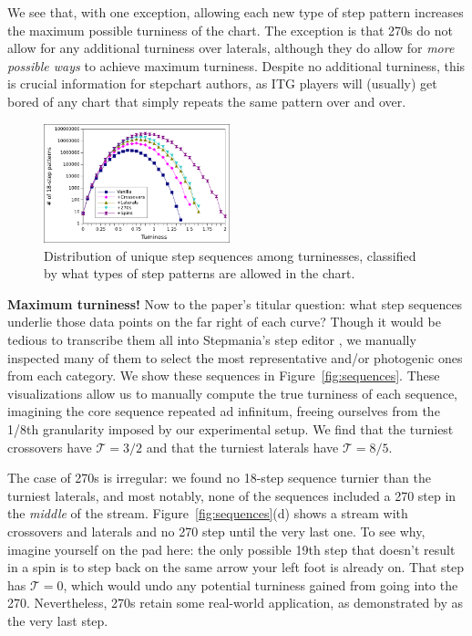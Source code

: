 \documentclass[10pt]{sigplanconf}
\begin{document}
We see that, with one exception, allowing each new type of step pattern increases the maximum possible turniness of the chart.
The exception is that 270s do not allow for any additional turniness over laterals, although they do allow for {\em more possible ways} to achieve maximum turniness.
Despite no additional turniness, this is crucial information for stepchart authors, as ITG players will (usually) get bored of any chart that simply repeats the same pattern over and over.

\begin{figure}[t]
	\begin{center}
	\includegraphics[width=0.48\textwidth]{turniness.pdf}
	\end{center}
	\caption{Distribution of unique step sequences among turninesses, classified by what types of step patterns are allowed in the chart.}
	\label{fig:graph}
\end{figure}

{\bf Maximum turniness!}
Now to the paper's titular question: what step sequences underlie those data points on the far right of each curve?
Though it would be tedious to transcribe them all into Stepmania's step editor \cite{stepmania}, we manually inspected many of them to select the most representative and/or photogenic ones from each category. We show these sequences in Figure~\ref{fig:sequences}.
These visualizations allow us to manually compute the true turniness of each sequence, imagining the core sequence repeated ad infinitum, freeing ourselves from the 1/8th granularity imposed by our experimental setup.
We find that the turniest crossovers have $\mathcal{T}=3/2$ and that the turniest laterals have $\mathcal{T}=8/5$.

The case of 270s is irregular: we found no 18-step sequence turnier than the turniest laterals, and most notably,
none of the sequences included a 270 step in the {\em middle} of the stream.
Figure~\ref{fig:sequences}(d) shows a stream with crossovers and laterals and no 270 step until the very last one.
To see why, imagine yourself on the pad here: the only possible 19th step that doesn't result in a spin is to step back on the same arrow your left foot is already on.
That step has $\mathcal{T}=0$, which would undo any potential turniness gained from going into the 270.
Nevertheless, 270s retain some real-world application, as demonstrated by \cite{utopia} as the very last step.
\end{document}
